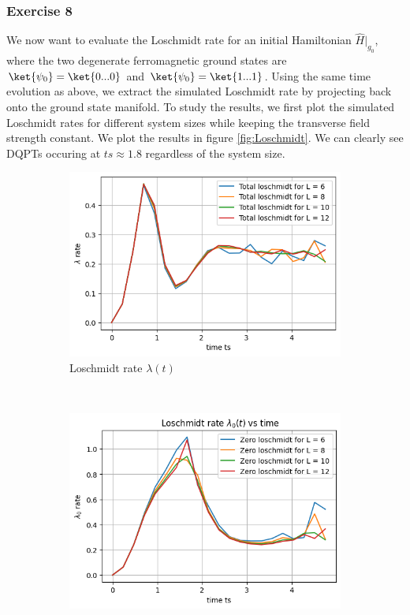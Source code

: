 \subsubsection{Exercise 8}
We now want to evaluate the Loschmidt rate for an initial Hamiltonian $\hat{H}|_{g_0}$, where the two degenerate
ferromagnetic ground states are $\ket{\psi_0} =\ket{0...0}$ and $\ket{\psi_0} =\ket{1...1}$. Using the same time evolution as above, we extract the simulated Loschmidt rate by projecting back onto the ground state manifold. To study the results, we first plot the simulated Loschmidt rates for different system sizes while keeping the transverse field strength constant. We plot the results in figure \ref{fig:Loschmidt}. We can clearly see DQPTs occuring at $ts\approx1.8$ regardless of the system size.
\begin{figure}[h]
    \centering
    \caption{Simulated Loschmidt rates for different system sizes L with a strength of the transverse field g=2.}
    \label{fig:Loschmidt}
    \addtocounter{figure}{-1}
    \begin{subfigure}[t]{0.48\textwidth}
        \includegraphics[width=\textwidth]{tex/figures/Lochschmidt.png}
        \caption{Loschmidt rate $\lambda(t)$}
    \end{subfigure}\\
    \begin{subfigure}[t]{0.48\textwidth}
        \includegraphics[width=\textwidth]{tex/figures/Loschmidt0.png}

\end{subfigure}
\end{figure}
